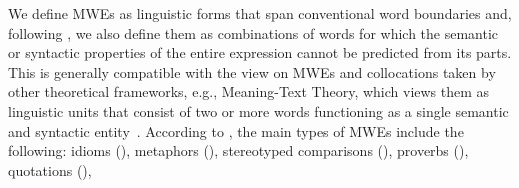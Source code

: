 \documentclass[output=paper,colorlinks,citecolor=brown]{langscibook}
\begin{document}
We define MWEs as linguistic forms that span conventional word boundaries and, following
\citet{Sag:Baldwin:2002}, we also define them as combinations of words for which the semantic or syntactic properties of the entire expression cannot be predicted from its parts.
%
This is generally compatible with the view on MWEs and collocations taken by other theoretical frameworks, e.g., Meaning-Text Theory, which views them as linguistic units that consist of two or more words functioning as a single semantic and syntactic entity~\citep{mel2006explanatory}.
According to \citet{HueningSchluecker2015MWE}, the main types of MWEs include the following:
    idioms (),
    metaphors (),
    stereotyped comparisons (),
    proverbs (),
    quotations (),
\end{document}
